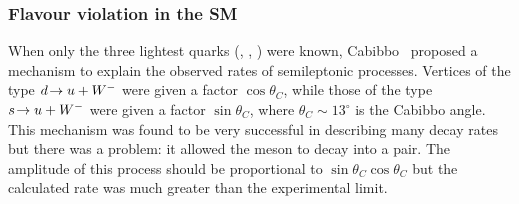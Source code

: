 




\subsubsection{Flavour violation in the SM}
\label{sec:theory:flavourviolation}

When only the three lightest quarks (\uquark, \dquark, \squark) were known, Cabibbo~\cite{cabbibo} proposed a mechanism to explain the observed rates of semileptonic processes. Vertices of the type ${d}\!\rightarrow {\ensuremath{u}}+{W^-}$ were given a factor $\cos\theta_{C}$, while those of the type ${s}\!\rightarrow {\ensuremath{u}}+{W^-}$ were given a factor $\sin\theta_{C}$, where $\theta_{C}\sim13^{\circ}$ is the Cabibbo angle. This mechanism was found to be very successful in describing many decay rates but there was a problem: it allowed the \Kz meson to decay into a \mumu pair. The amplitude of this process should be proportional to $\sin\theta_{C}\cos\theta_{C}$ but the calculated rate was much greater than the experimental limit. 


